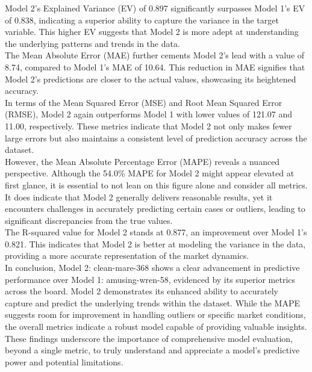 Model 2's Explained Variance (EV) of 0.897 significantly surpasses Model 1's EV of 0.838, indicating a superior ability to capture the variance in the target variable. This higher EV suggests that Model 2 is more adept at understanding the underlying patterns and trends in the data. \\

The Mean Absolute Error (MAE) further cements Model 2's lead with a value of 8.74, compared to Model 1's MAE of 10.64. This reduction in MAE signifies that Model 2's predictions are closer to the actual values, showcasing its heightened accuracy. \\

In terms of the Mean Squared Error (MSE) and Root Mean Squared Error (RMSE), Model 2 again outperforms Model 1 with lower values of 121.07 and 11.00, respectively. These metrics indicate that Model 2 not only makes fewer large errors but also maintains a consistent level of prediction accuracy across the dataset. \\

However, the Mean Absolute Percentage Error (MAPE) reveals a nuanced perspective. Although the 54.0\% MAPE for Model 2 might appear elevated at first glance, it is essential to not lean on this figure alone and consider all metrics. It does indicate that Model 2 generally delivers reasonable results, yet it encounters challenges in accurately predicting certain cases or outliers, leading to significant discrepancies from the true values. \\

The R-squared value for Model 2 stands at 0.877, an improvement over Model 1's 0.821. This indicates that Model 2 is better at modeling the variance in the data, providing a more accurate representation of the market dynamics. \\

In conclusion, Model 2: clean-mare-368 shows a clear advancement in predictive performance over Model 1: amusing-wren-58, evidenced by its superior metrics across the board. Model 2 demonstrates its enhanced ability to accurately capture and predict the underlying trends within the dataset. While the MAPE suggests room for improvement in handling outliers or specific market conditions, the overall metrics indicate a robust model capable of providing valuable insights. These findings underscore the importance of comprehensive model evaluation, beyond a single metric, to truly understand and appreciate a model's predictive power and potential limitations.
 

